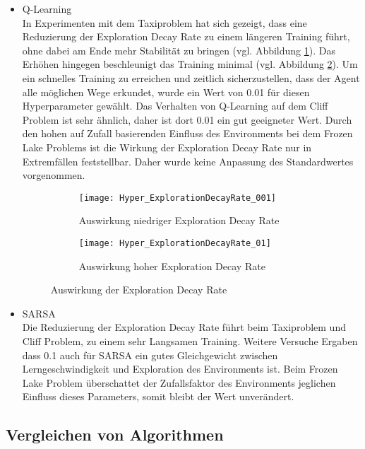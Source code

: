 \begin{itemize}
  \item Q-Learning\\
  In Experimenten mit dem Taxiproblem hat sich gezeigt, dass eine Reduzierung der Exploration Decay Rate zu einem längeren Training führt, ohne dabei am Ende mehr Stabilität zu bringen (vgl. Abbildung \ref{fig:ExplorationDecayRate_low}).
  Das Erhöhen hingegen beschleunigt das Training minimal (vgl. Abbildung \ref{fig:ExplorationDecayRate_high}).
  Um ein schnelles Training zu erreichen und zeitlich sicherzustellen, dass der Agent alle möglichen Wege erkundet, wurde ein Wert von 0.01 für diesen Hyperparameter gewählt.
  Das Verhalten von Q-Learning auf dem Cliff Problem ist sehr ähnlich, daher ist dort 0.01 ein gut geeigneter Wert.
  Durch den hohen auf Zufall basierenden Einfluss des Environments bei dem Frozen Lake Problems ist die Wirkung der Exploration Decay Rate nur in Extremfällen feststellbar.
  Daher wurde keine Anpassung des Standardwertes vorgenommen.
  \begin{figure}[H]
    \centering
    \begin{subfigure}{.5\textwidth}
      \centering
      \texttt{[image: Hyper\_ExplorationDecayRate\_001]}
      \caption{Auswirkung niedriger Exploration Decay Rate}
      \label{fig:ExplorationDecayRate_low}
    \end{subfigure}%
    \begin{subfigure}{.5\textwidth}
      \centering
      \texttt{[image: Hyper\_ExplorationDecayRate\_01]}
      \caption{Auswirkung hoher Exploration Decay Rate}
      \label{fig:ExplorationDecayRate_high}
    \end{subfigure}
    \caption{Auswirkung der Exploration Decay Rate}
    \label{fig:ExplorationDecayRate_Q-Learning}
  \end{figure}
  \item SARSA\\
  Die Reduzierung der Exploration Decay Rate führt beim Taxiproblem und Cliff Problem, zu einem sehr Langsamen Training.
  Weitere Versuche Ergaben dass 0.1 auch für SARSA ein gutes Gleichgewicht zwischen Lerngeschwindigkeit und Exploration des Environments ist.
  Beim Frozen Lake Problem überschattet der Zufallsfaktor des Environments jeglichen Einfluss dieses Parameters, somit bleibt der Wert unverändert.

\end{itemize}

\subsection{Vergleichen von Algorithmen}

